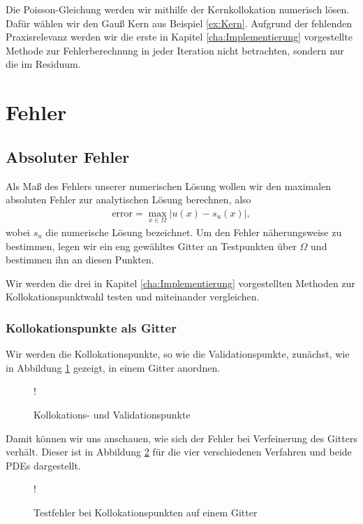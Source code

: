Die Poisson-Gleichung werden wir mithilfe der Kernkollokation numerisch lösen. Dafür wählen wir den Gauß Kern aus Beispiel \ref{ex:Kern}. Aufgrund der fehlenden Praxisrelevanz werden wir die erste in Kapitel \ref{cha:Implementierung} vorgestellte Methode zur Fehlerberechnung in jeder Iteration nicht betrachten, sondern nur die im Residuum.

\section{Fehler}
\subsection{Absoluter Fehler}

Als Maß des Fehlers unserer numerischen Lösung wollen wir den maximalen absoluten Fehler zur analytischen Lösung berechnen, also
\begin{align*}
\text{error} = \max_{x \in \Omega} |u(x) - s_u (x)|,
\end{align*}
wobei $s_u$ die numerische Lösung bezeichnet. Um den Fehler näherungsweise zu bestimmen, legen wir ein eng gewähltes Gitter an Testpunkten über $\Omega$ und bestimmen ihn an diesen Punkten.

Wir werden die drei in Kapitel \ref{cha:Implementierung} vorgestellten Methoden zur Kollokationspunktwahl testen und miteinander vergleichen. 

\subsubsection{Kollokationspunkte als Gitter}
Wir werden die Kollokationspunkte, so wie die Validationspunkte, zunächst, wie in Abbildung \ref{fig:Kollok} gezeigt, in einem Gitter anordnen.
\begin{figure}[H]
\centering
\resizebox {.6\columnwidth} {!} {

}
\caption{Kollokations- und Validationspunkte}
\label{fig:Kollok}
\end{figure}

Damit können wir uns anschauen, wie sich der Fehler bei Verfeinerung des Gitters verhält. Dieser ist in Abbildung \ref{fig:error-grid-both} für die vier verschiedenen Verfahren und beide \acp{PDE} dargestellt. 
%
\begin{figure}[ht]
\centering
\resizebox {\columnwidth} {!} {

}
\caption{Testfehler bei Kollokationspunkten auf einem Gitter}
\label{fig:error-grid-both}
\end{figure}

